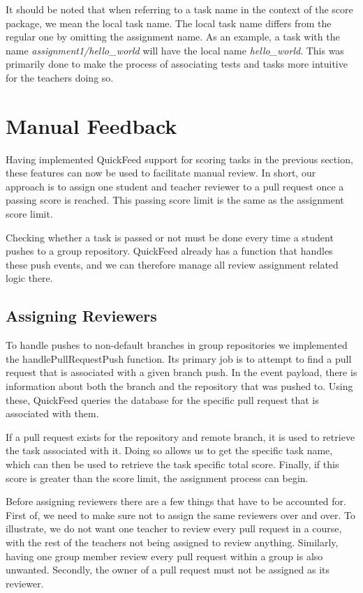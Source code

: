 It should be noted that when referring to a task name in the context of the score package, we mean the local task name.
The local task name differs from the regular one by omitting the assignment name.
As an example, a task with the name \textit{assignment1/hello\_world} will have the local name \textit{hello\_world}.
This was primarily done to make the process of associating tests and tasks more intuitive for the teachers doing so.

\section{Manual Feedback}

Having implemented QuickFeed support for scoring tasks in the previous section, these features can now be used to facilitate manual review.
In short, our approach is to assign one student and teacher reviewer to a pull request once a passing score is reached.
This passing score limit is the same as the assignment score limit.

Checking whether a task is passed or not must be done every time a student pushes to a group repository.
QuickFeed already has a function that handles these push events, and we can therefore manage all review assignment related logic there.

\subsection{Assigning Reviewers}
\label{sec:assigning-reviewers}

To handle pushes to non-default branches in group repositories we implemented the handlePullRequestPush function.
Its primary job is to attempt to find a pull request that is associated with a given branch push.
In the event payload, there is information about both the branch and the repository that was pushed to.
Using these, QuickFeed queries the database for the specific pull request that is associated with them.

If a pull request exists for the repository and remote branch, it is used to retrieve the task associated with it.
Doing so allows us to get the specific task name, which can then be used to retrieve the task specific total score.
Finally, if this score is greater than the score limit, the assignment process can begin.

Before assigning reviewers there are a few things that have to be accounted for.
First of, we need to make sure not to assign the same reviewers over and over.
To illustrate, we do not want one teacher to review every pull request in a course, with the rest of the teachers not being assigned to review anything.
Similarly, having one group member review every pull request within a group is also unwanted.
Secondly, the owner of a pull request must not be assigned as its reviewer.

